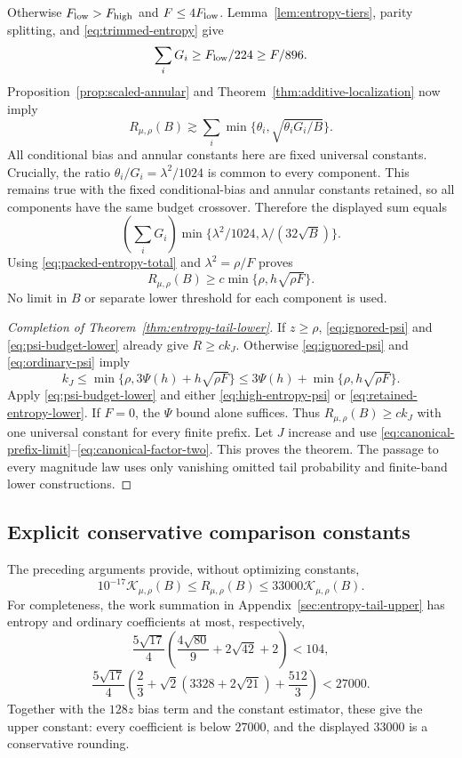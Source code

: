 Otherwise $F_{\rm low}>F_{\rm high}$ and $F\le4F_{\rm low}$.
Lemma~\ref{lem:entropy-tiers}, parity splitting, and
\eqref{eq:trimmed-entropy} give
\begin{equation}\label{eq:packed-entropy-total}
 \sum_iG_i\ge F_{\rm low}/224\ge F/896.
\end{equation}
Proposition~\ref{prop:scaled-annular} and
Theorem~\ref{thm:additive-localization} now imply
\[
 R_{\mu,\rho}(B)\gtrsim
       \sum_i\min\{\theta_i,\sqrt{\theta_iG_i/B}\}.
\]
All conditional bias and annular constants here are fixed universal
constants. Crucially, the ratio $\theta_i/G_i=\lambda^2/1024$ is common
to every component. This remains true with the fixed conditional-bias
and annular constants retained, so all components have the same budget
crossover. Therefore the displayed sum equals
\[
 \left(\sum_iG_i\right)
       \min\{\lambda^2/1024,\lambda/(32\sqrt B)\}.
\]
Using \eqref{eq:packed-entropy-total} and
$\lambda^2=\rho/F$ proves
\begin{equation}\label{eq:retained-entropy-lower}
 R_{\mu,\rho}(B)\ge c
                  \min\{\rho,h\sqrt{\rho F}\}.
\end{equation}
No limit in $B$ or separate lower threshold for each component is used.

\begin{proof}[Completion of Theorem~\ref{thm:entropy-tail-lower}]
If $z\ge\rho$, \eqref{eq:ignored-psi} and
\eqref{eq:psi-budget-lower} already give $R\ge c k_J$.
Otherwise \eqref{eq:ignored-psi} and \eqref{eq:ordinary-psi} imply
\[
 k_J\le\min\{\rho,3\Psi(h)+h\sqrt{\rho F}\}
       \le3\Psi(h)+\min\{\rho,h\sqrt{\rho F}\}.
\]
Apply \eqref{eq:psi-budget-lower} and either
\eqref{eq:high-entropy-psi} or \eqref{eq:retained-entropy-lower}.
If $F=0$, the $\Psi$ bound alone suffices.
Thus $R_{\mu,\rho}(B)\ge c k_J$ with one universal constant for every
finite prefix. Let $J$ increase and use
\eqref{eq:canonical-prefix-limit}--\eqref{eq:canonical-factor-two}.
This proves the theorem. The passage to every magnitude law uses only
vanishing omitted tail probability and finite-band lower constructions.
\end{proof}


\subsection{Explicit conservative comparison constants}

The preceding arguments provide, without optimizing constants,
\begin{equation}\label{eq:explicit-main-constants}
 10^{-17}\mathcal K_{\mu,\rho}(B)
 \le R_{\mu,\rho}(B)\le33000\mathcal K_{\mu,\rho}(B).
\end{equation}
For completeness, the work summation in Appendix~\ref{sec:entropy-tail-upper} has
entropy and ordinary coefficients at most, respectively,
\[
 \frac{5\sqrt{17}}4
 \left(\frac{4\sqrt{80}}9+2\sqrt{42}+2\right)<104,
\]
\[
 \frac{5\sqrt{17}}4
 \left(\frac23+\sqrt2(3328+2\sqrt{21})+\frac{512}3\right)<27000.
\]
Together with the $128z$ bias term and the constant estimator, these
give the upper constant: every coefficient is below $27000$, and the
displayed $33000$ is a conservative rounding.

